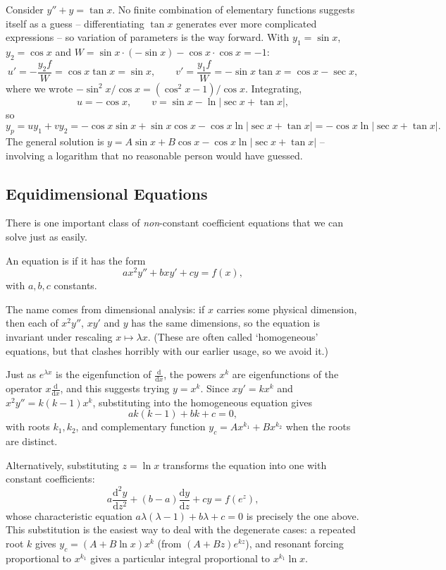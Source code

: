\documentclass[a4paper]{scrartcl}
\begin{document}
\begin{example}
	Consider $y'' + y = \tan x$. No finite combination of elementary functions suggests itself as a guess -- differentiating $\tan x$ generates ever more complicated expressions -- so variation of parameters is the way forward. With $y_1 = \sin x$, $y_2 = \cos x$ and $W = \sin x \cdot(-\sin x) - \cos x \cdot \cos x = -1$:
	$$
	u' = -\frac{y_2 f}{W} = \cos x \tan x = \sin x, \qquad v' = \frac{y_1 f}{W} = -\sin x \tan x = \cos x - \sec x,
	$$
	where we wrote $-\sin^2 x/\cos x = (\cos^2 x - 1)/\cos x$. Integrating,
	$$
	u = -\cos x, \qquad v = \sin x - \ln|\sec x + \tan x|,
	$$
	so
	$$
	y_p = u y_1 + v y_2 = -\cos x \sin x + \sin x \cos x - \cos x \ln |\sec x + \tan x| = -\cos x \ln|\sec x + \tan x|.
	$$
	The general solution is $y = A \sin x + B \cos x - \cos x \ln |\sec x + \tan x|$ -- involving a logarithm that no reasonable person would have guessed.
\end{example}

\subsection{Equidimensional Equations}

There is one important class of \emph{non}-constant coefficient equations that we can solve just as easily.

\begin{definition}
	An equation is  if it has the form
	$$
	a x^2 y'' + b x y' + c y = f(x),
	$$
	with $a, b, c$ constants.
\end{definition}

The name comes from dimensional analysis: if $x$ carries some physical dimension, then each of $x^2 y''$, $xy'$ and $y$ has the same dimensions, so the equation is invariant under rescaling $x \mapsto \lambda x$. (These are often called `homogeneous' equations, but that clashes horribly with our earlier usage, so we avoid it.)

Just as $e^{\lambda x}$ is the eigenfunction of $\frac{\mathrm{d}}{\mathrm{d}x}$, the powers $x^k$ are eigenfunctions of the operator $x \frac{\mathrm{d}}{\mathrm{d}x}$, and this suggests trying $y = x^k$. Since $xy' = k x^k$ and $x^2 y'' = k(k-1)x^k$, substituting into the homogeneous equation gives
$$
a k (k - 1) + bk + c = 0,
$$
with roots $k_1, k_2$, and complementary function $y_c = A x^{k_1} + B x^{k_2}$ when the roots are distinct.

Alternatively, substituting $z = \ln x$ transforms the equation into one with constant coefficients:
$$
a \frac{\mathrm{d}^2 y}{\mathrm{d}z^2} + (b - a) \frac{\mathrm{d}y}{\mathrm{d}z} + c y = f(e^z),
$$
whose characteristic equation $a\lambda(\lambda - 1) + b\lambda + c = 0$ is precisely the one above. This substitution is the easiest way to deal with the degenerate cases: a repeated root $k$ gives $y_c = (A + B \ln x)x^k$ (from $(A + Bz)e^{kz}$), and resonant forcing proportional to $x^{k_1}$ gives a particular integral proportional to $x^{k_1} \ln x$.
\end{document}
